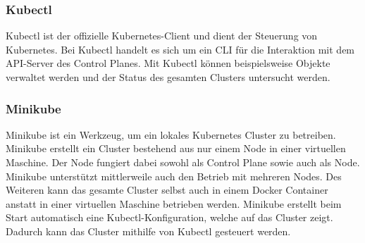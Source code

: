 \subsubsection{Kubectl}

Kubectl ist der offizielle Kubernetes-Client und dient der Steuerung von Kubernetes. Bei Kubectl handelt es sich um ein \ac{CLI} für die Interaktion mit dem \ac{API}-Server des Control Planes. Mit Kubectl können beispielsweise Objekte verwaltet werden und der Status des gesamten Clusters untersucht werden.

\subsubsection{Minikube}

Minikube ist ein Werkzeug, um ein lokales Kubernetes Cluster zu betreiben. Minikube erstellt ein Cluster bestehend aus nur einem Node in einer virtuellen Maschine. Der Node fungiert dabei sowohl als Control Plane sowie auch als Node. Minikube unterstützt mittlerweile auch den Betrieb mit mehreren Nodes. Des Weiteren kann das gesamte Cluster selbst auch in einem Docker Container anstatt in einer virtuellen Maschine betrieben werden. Minikube erstellt beim Start automatisch eine Kubectl-Konfiguration, welche auf das Cluster zeigt. Dadurch kann das Cluster mithilfe von Kubectl gesteuert werden. 